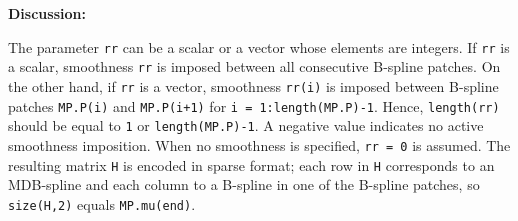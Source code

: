 \documentclass[10pt]{./acmtrans2e}
\newenvironment{remark}
{\vspace*{0.1cm}
\noindent \textbf{Discussion:} \medskip

}
{
\vspace*{0.2cm}
}
\begin{document}
\begin{remark}
\noindent The parameter \texttt{rr} can be a scalar or a vector whose elements are integers.
If \texttt{rr} is a scalar, smoothness \texttt{rr} is imposed between all consecutive B-spline patches.
On the other hand, if \texttt{rr} is a vector, smoothness \texttt{rr(i)} is imposed between B-spline patches \texttt{MP.P(i)} and \texttt{MP.P(i+1)} for \texttt{i = 1:length(MP.P)-1}.
Hence, \texttt{length(rr)} should be equal to \texttt{1} or \texttt{length(MP.P)-1}. 
A negative value indicates no active smoothness imposition.
When no smoothness is specified, \texttt{rr = 0} is assumed. 
The resulting matrix \texttt{H} is encoded in sparse format;
each row in \texttt{H} corresponds to an MDB-spline and each column to a B-spline in one of the B-spline patches, so \texttt{size(H,2)} equals \texttt{MP.mu(end)}.
\end{remark}
\end{document}
